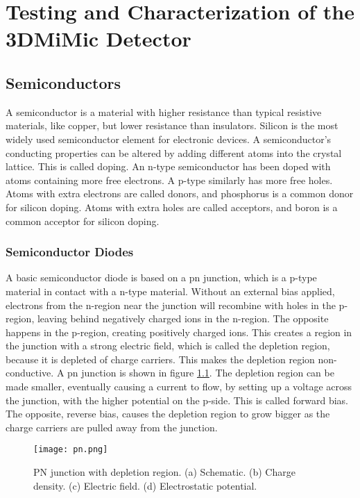 \documentclass[../main/thesis.tex]{subfiles}
\begin{document}
\newchapter
\chapter{Testing and Characterization of the 3DMiMic Detector}
\label{3dmimic}

\section{Semiconductors}
\label{t-semi}

A semiconductor is a material with higher resistance than typical resistive materials, like copper, but lower resistance than insulators. Silicon is the most widely used semiconductor element for electronic devices. A semiconductor's conducting properties can be altered by adding different atoms into the crystal lattice. This is called doping. An n-type semiconductor has been doped with atoms containing more free electrons. A p-type similarly has more free holes. Atoms with extra electrons are called donors, and phosphorus is a common donor for silicon doping. Atoms with extra holes are called acceptors, and boron is a common acceptor for silicon doping. \citep[chap. 11]{Knoll}

\subsection{Semiconductor Diodes}

A basic semiconductor diode is based on a pn junction, which is a p-type material in contact with a n-type material. Without an external bias applied, electrons from the n-region near the junction will recombine with holes in the p-region, leaving behind negatively charged ions in the n-region. The opposite happens in the p-region, creating positively charged ions. This creates a region in the junction with a strong electric field, which is called the depletion region, because it is depleted of charge carriers. This makes the depletion region non-conductive. A pn junction is shown in figure \ref{fig-pn}. The depletion region can be made smaller, eventually causing a current to flow, by setting up a voltage across the junction, with the higher potential on the p-side. This is called forward bias. The opposite, reverse bias, causes the depletion region to grow bigger as the charge carriers are pulled away from the junction. \citep[chap. 1]{analogbok}

\begin{figure}%
	\centering
	\texttt{[image: pn.png]}
	\caption{PN junction with depletion region. (a) Schematic. (b) Charge density. (c) Electric field. (d) Electrostatic potential. \citep{analogbok}}
	\label{fig-pn}
\end{figure}
\end{document}
